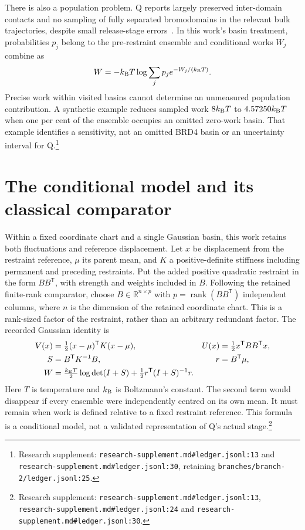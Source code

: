 \documentclass{article}
\begin{document}
There is also a population problem. Q reports largely preserved inter-domain contacts and no sampling of fully separated bromodomains in the relevant bulk trajectories, despite small release-stage errors~\cite{Q}. In this work's basin treatment, probabilities \(p_j\) belong to the pre-restraint ensemble and conditional works \(W_j\) combine as
\[
 W=-k_{\rm B}T\log\sum_jp_j e^{-W_j/(k_{\rm B}T)}.
\]
Precise work within visited basins cannot determine an unmeasured population contribution. A synthetic example reduces sampled work \(8k_{\rm B}T\) to \(4.57250k_{\rm B}T\) when one per cent of the ensemble occupies an omitted zero-work basin. That example identifies a sensitivity, not an omitted BRD4 basin or an uncertainty interval for Q.\footnote{Research supplement: \nolinkurl{research-supplement.md\#ledger.jsonl:13} and \nolinkurl{research-supplement.md\#ledger.jsonl:30}, retaining \nolinkurl{branches/branch-2/ledger.jsonl:25}.}

\section{The conditional model and its classical comparator}

Within a fixed coordinate chart and a single Gaussian basin, this work retains both fluctuations and reference displacement. Let \(x\) be displacement from the restraint reference, \(\mu\) its parent mean, and \(K\) a positive-definite stiffness including permanent and preceding restraints. Put the added positive quadratic restraint in the form \(BB^{\mathsf T}\), with strength and weights included in \(B\). Following the retained finite-rank comparator, choose \(B\in\mathbb{R}^{n\times p}\) with \(p=\operatorname{rank}(BB^{\mathsf T})\) independent columns, where \(n\) is the dimension of the retained coordinate chart. This is a rank-sized factor of the restraint, rather than an arbitrary redundant factor. The recorded Gaussian identity is
\[
\begin{aligned}
 V(x)&=\tfrac12(x-\mu)^{\mathsf T}K(x-\mu),&
 U(x)&=\tfrac12x^{\mathsf T}BB^{\mathsf T}x,\\
 S&=B^{\mathsf T}K^{-1}B,&r&=B^{\mathsf T}\mu,\\
 W&=\tfrac{k_{\rm B}T}{2}\log\det(I+S)
       +\tfrac12r^{\mathsf T}(I+S)^{-1}r.
\end{aligned}
\]
Here \(T\) is temperature and \(k_{\rm B}\) is Boltzmann's constant. The second term would disappear if every ensemble were independently centred on its own mean. It must remain when work is defined relative to a fixed restraint reference. This formula is a conditional model, not a validated representation of Q's actual stage.\footnote{Research supplement: \nolinkurl{research-supplement.md\#ledger.jsonl:13}, \nolinkurl{research-supplement.md\#ledger.jsonl:24} and \nolinkurl{research-supplement.md\#ledger.jsonl:30}.}
\end{document}

